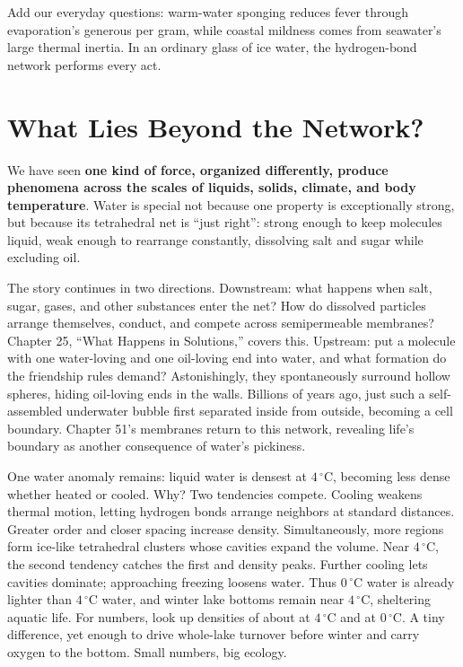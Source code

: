 Add our everyday questions: warm-water sponging reduces fever through evaporation's generous  per gram, while coastal mildness comes from seawater's large thermal inertia. In an ordinary glass of ice water, the hydrogen-bond network performs every act.

\section{What Lies Beyond the Network?}

We have seen \textbf{one kind of force, organized differently, produce phenomena across the scales of liquids, solids, climate, and body temperature}. Water is special not because one property is exceptionally strong, but because its tetrahedral net is ``just right'': strong enough to keep molecules liquid, weak enough to rearrange constantly, dissolving salt and sugar while excluding oil.

The story continues in two directions. Downstream: what happens when salt, sugar, gases, and other substances enter the net? How do dissolved particles arrange themselves, conduct, and compete across semipermeable membranes? Chapter 25, ``What Happens in Solutions,'' covers this. Upstream: put a molecule with one water-loving and one oil-loving end into water, and what formation do the friendship rules demand? Astonishingly, they spontaneously surround hollow spheres, hiding oil-loving ends in the walls. Billions of years ago, just such a self-assembled underwater bubble first separated inside from outside, becoming a cell boundary. Chapter 51's membranes return to this network, revealing life's boundary as another consequence of water's pickiness.

\begin{tiaozhan}
One water anomaly remains: liquid water is densest at $4\,^{\circ}\mathrm{C}$, becoming less dense whether heated or cooled. Why? Two tendencies compete. Cooling weakens thermal motion, letting hydrogen bonds arrange neighbors at standard distances. Greater order and closer spacing increase density. Simultaneously, more regions form ice-like tetrahedral clusters whose cavities expand the volume. Near $4\,^{\circ}\mathrm{C}$, the second tendency catches the first and density peaks. Further cooling lets cavities dominate; approaching freezing loosens water. Thus $0\,^{\circ}\mathrm{C}$ water is already lighter than $4\,^{\circ}\mathrm{C}$ water, and winter lake bottoms remain near $4\,^{\circ}\mathrm{C}$, sheltering aquatic life. For numbers, look up densities of about  at $4\,^{\circ}\mathrm{C}$ and  at $0\,^{\circ}\mathrm{C}$. A tiny difference, yet enough to drive whole-lake turnover before winter and carry oxygen to the bottom. Small numbers, big ecology.
\end{tiaozhan}

